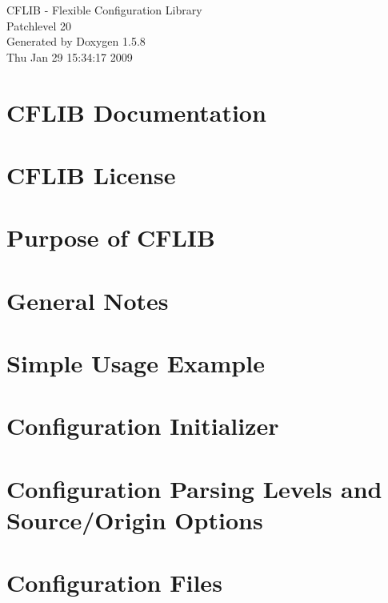 \documentclass[a4paper]{article}
\begin{document}
\begin{titlepage}
\vspace*{7cm}
\begin{center}
{\Large CFLIB - Flexible Configuration Library \\[1ex]\large Patchlevel 20 }\\
\vspace*{1cm}
{\large Generated by Doxygen 1.5.8}\\
\vspace*{0.5cm}
{\small Thu Jan 29 15:34:17 2009}\\
\end{center}
\end{titlepage}
\tableofcontents
{}
\section{CFLIB Documentation}
\label{index}\hypertarget{index}{}
\section{CFLIB License}
\label{license}
\hypertarget{license}{}

\section{Purpose of CFLIB}
\label{purpose}
\hypertarget{purpose}{}

\section{General Notes}
\label{properties}
\hypertarget{properties}{}

\section{Simple Usage Example}
\label{simple_example}
\hypertarget{simple_example}{}

\section{Configuration Initializer}
\label{config_initializer}
\hypertarget{config_initializer}{}

\section{Configuration Parsing Levels and Source/Origin Options}
\label{config_levels}
\hypertarget{config_levels}{}

\section{Configuration Files}
\label{config_files}
\hypertarget{config_files}{}

\end{document}
